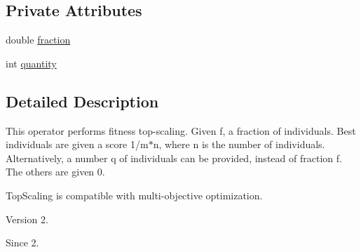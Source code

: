 \subsection*{Private Attributes}
\begin{DoxyCompactItemize}
\item 
double \hyperlink{classjenes_1_1stage_1_1operator_1_1common_1_1_top_scaling_3_01_t_01extends_01_chromosome_01_4_ac4dcb017229ce4f914aa9aa0fa9c06b9}{fraction}
\item 
int \hyperlink{classjenes_1_1stage_1_1operator_1_1common_1_1_top_scaling_3_01_t_01extends_01_chromosome_01_4_a89dca8db478aefb4c249da3a7b75f0ad}{quantity}
\end{DoxyCompactItemize}


\subsection{Detailed Description}
This operator performs fitness top-\/scaling. Given f, a fraction of individuals. Best individuals are given a score 1/m$\ast$n, where n is the number of individuals. Alternatively, a number q of individuals can be provided, instead of fraction f. The others are given 0. 

Top\-Scaling is compatible with multi-\/objective optimization.

\begin{DoxyVersion}{Version}
2. 
\end{DoxyVersion}
\begin{DoxySince}{Since}
2. 
\end{DoxySince}


